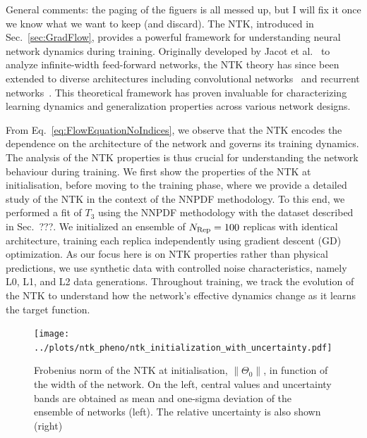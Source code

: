 \ac{General comments: the paging of the figuers is all messed up, but I will fix
it once we know what we want to keep (and discard).} The NTK, introduced in
Sec.~\ref{sec:GradFlow}, provides a powerful framework for understanding neural
network dynamics during training. Originally developed by Jacot et
al.~\cite{jacot2018neural} to analyze infinite-width feed-forward networks, the
NTK theory has since been extended to diverse architectures including
convolutional networks~\cite{arora2019exact} and recurrent
networks~\cite{alemohammad2021recurrent}. This theoretical framework has proven
invaluable for characterizing learning dynamics and generalization properties
across various network designs.

From Eq.~\eqref{eq:FlowEquationNoIndices}, we observe that the NTK encodes the
dependence on the architecture of the network and governs its training dynamics.
The analysis of the NTK properties is thus crucial for understanding the network
behaviour during training. We first show the properties of the NTK at
initialisation, before moving to the training phase, where we provide a detailed
study of the NTK in the context of the NNPDF methodology. To this end, we
performed a fit of $T_3$ using the NNPDF methodology with the dataset described
in Sec.~???. We initialized an ensemble of $N_{\rm Rep} = 100$ replicas with
identical architecture, training each replica independently using gradient
descent (GD) optimization. As our focus here is on NTK properties rather than
physical predictions, we use synthetic data with controlled noise
characteristics, namely L0, L1, and L2 data generations. Throughout training, we
track the evolution of the NTK to understand how the network's effective
dynamics change as it learns the target function.

\begin{figure}[h!]
  \centering
  \texttt{[image: ../plots/ntk\_pheno/ntk\_initialization\_with\_uncertainty.pdf]}
  \caption{Frobenius norm of the NTK at initialisation, $\lVert \Theta_0
  \rVert$, in function of the width of the network. On the left, central values
  and uncertainty bands are obtained as mean and one-sigma deviation of the
  ensemble of networks (left). The relative uncertainty is also shown (right)}
  \label{fig:NTKInit}
\end{figure}

